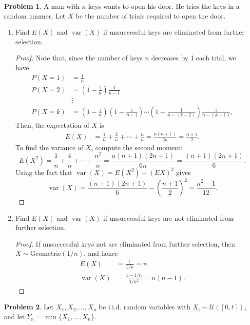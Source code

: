 \documentclass[oneside,reqno]{amsart}
\DeclareMathOperator{\var}{\mathrm{var}}
\newcommand{\Ucal}{\mathcal{U}}
\theoremstyle{definition}
\newtheorem{prob}{Problem}
\begin{document}
\begin{prob}
A man with $n$ keys wants to open his door. He tries the keys in a random manner. Let $X$ be the number of trials required to open the door. 
\end{prob}


\begin{enumerate}
\item
Find $E(X)$ and $\var(X)$  if unsuccessful keys are eliminated from further selection.
\begin{proof}
Note that, since the number of keys $n$ decreases by 1 each trial, we have
\begin{align*}
	P(X=1) &= \frac{1}{n} \\
	P(X=2) &= \left(1-\frac{1}{n}\right) \frac{1}{n-1} \\
	&\vdots \\
	P(X=k) &= \left(1-\frac{1}{n}\right)\left(1-\frac{1}{n-1}\right) \cdots \left(1-\frac{1}{n-(k-2)}\right) \frac{1}{n-(k-1)},
\end{align*}
Then, the expectation of $X$ is
\begin{align*}
	E (X) &= \frac{1}{n} + \frac{2}{n} + \cdots + \frac{n}{n} = \frac{n(n+1)}{2n} = \frac{n+1}{2}.
\end{align*}
To find the variance of $X$, compute the second moment:
\[
	E (X^2) = \frac{1}{n} + \frac{4}{n} + \cdots + \frac{n^2}{n} = \frac{n(n+1)(2n+1)}{6n}=\frac{(n+1)(2n+1)}{6}.
\]
Using the fact that $\var(X) = E (X^2) - (E X)^2$ gives 
\[
	\var(X) = \frac{(n+1)(2n+1)}{6} - \left(  \frac{n+1}{2}  \right)^2 = \frac{n^2-1}{12}.
\]
\end{proof}
\item
Find $E(X)$ and $\var(X)$ if unsuccessful keys are not eliminated from further selection.
\begin{proof}
If unsuccessful keys not are eliminated from further selection, then $X \sim \text{Geometric}(1/n)$, and hence 
\begin{align*}
	E (X) &= \frac{1}{1/n} = n \\
	\var(X) &= \frac{1-1/n}{1/n^2} = n (n-1).
\end{align*}
\end{proof}

\end{enumerate}


\begin{prob}
Let $X_1,X_2,\dotsc, X_n$ be i.i.d. random variables with $X_i \sim \Ucal([0,t])$, and let $Y_n = \min\{ X_1,\dotsc, X_n\}$.
\end{prob}
\end{document}
